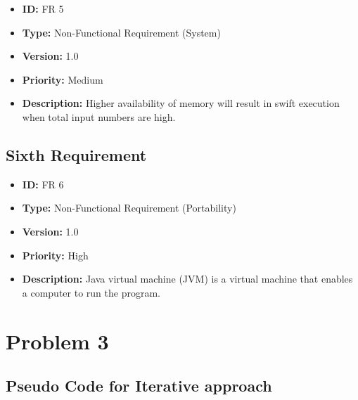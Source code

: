 \documentclass{scrartcl}
\begin{document}
\begin{LARGE}
\begin{itemize}
  \item \textbf{ID:} FR 5 
  \item \textbf{Type:} Non-Functional Requirement (System)
  \item \textbf{Version:} 1.0
  \item \textbf{Priority:} Medium 
  \item \textbf{Description:} Higher availability of memory will result in swift execution when total input numbers are high.    
\end{itemize}
\end{LARGE}

\subsection{Sixth Requirement}

\begin{LARGE}
\begin{itemize}
  \item \textbf{ID:} FR 6
  \item \textbf{Type:} Non-Functional Requirement (Portability) 
  \item \textbf{Version:} 1.0
  \item \textbf{Priority:} High 
  \item \textbf{Description:} Java virtual machine (JVM) is a virtual machine that enables a computer to run the program.
\end{itemize}
\end{LARGE}

\newpage

\section{Problem 3}

\subsection{Pseudo Code for Iterative approach}
\end{document}
